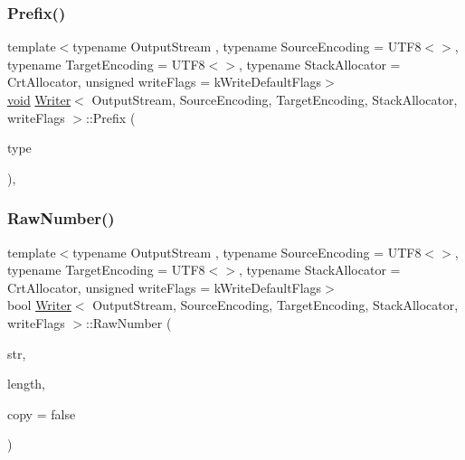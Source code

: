 \subsubsection{\texorpdfstring{Prefix()}{Prefix()}}
{\footnotesize\ttfamily template$<$typename Output\+Stream , typename Source\+Encoding  = U\+T\+F8$<$$>$, typename Target\+Encoding  = U\+T\+F8$<$$>$, typename Stack\+Allocator  = Crt\+Allocator, unsigned write\+Flags = k\+Write\+Default\+Flags$>$ \\
\hyperlink{imgui__impl__opengl3__loader_8h_ac668e7cffd9e2e9cfee428b9b2f34fa7}{void} \hyperlink{classWriter}{Writer}$<$ Output\+Stream, Source\+Encoding, Target\+Encoding, Stack\+Allocator, write\+Flags $>$\+::Prefix (\begin{DoxyParamCaption}\item[{\hyperlink{rapidjson_8h_a1d1cfd8ffb84e947f82999c682b666a7}{Type}}]{type }\end{DoxyParamCaption})\hspace{0.3cm}{\ttfamily [inline]}, {\ttfamily [protected]}}

\mbox{\label{classWriter_ad462dc606fddea0f34fc0e190c3bdaee}} 
\subsubsection{\texorpdfstring{Raw\+Number()}{RawNumber()}}
{\footnotesize\ttfamily template$<$typename Output\+Stream , typename Source\+Encoding  = U\+T\+F8$<$$>$, typename Target\+Encoding  = U\+T\+F8$<$$>$, typename Stack\+Allocator  = Crt\+Allocator, unsigned write\+Flags = k\+Write\+Default\+Flags$>$ \\
bool \hyperlink{classWriter}{Writer}$<$ Output\+Stream, Source\+Encoding, Target\+Encoding, Stack\+Allocator, write\+Flags $>$\+::Raw\+Number (\begin{DoxyParamCaption}\item[{const \hyperlink{classWriter_ab08bff5fd2daec65f4a78779ca3d2139}{Ch} $\ast$}]{str,  }\item[{\hyperlink{rapidjson_8h_a5ed6e6e67250fadbd041127e6386dcb5}{Size\+Type}}]{length,  }\item[{bool}]{copy = {\ttfamily false} }\end{DoxyParamCaption})\hspace{0.3cm}{\ttfamily [inline]}}

\mbox{\label{classWriter_ae0d1615104e4e88040b9640e6784008a}} 
